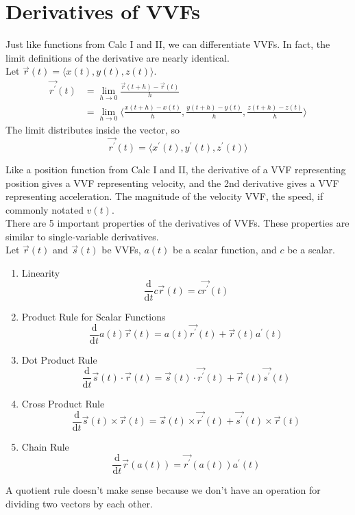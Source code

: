 \section{Derivatives of VVFs}
\noindent
Just like functions from Calc I and II, we can differentiate VVFs. In fact, the limit definitions of the derivative are nearly identical.\\
Let $\vec{r}(t) = \langle x(t), y(t), z(t) \rangle$.
\begin{align*}
	\vec{r^\prime}(t) &= \lim_{h\to 0}{\frac{\vec{r}(t+h)-\vec{r}(t)}{h}} \\
	&= \lim_{h\to 0}{\langle \frac{x(t+h)-x(t)}{h}, \frac{y(t+h)-y(t)}{h}, \frac{z(t+h)-z(t)}{h} \rangle}
\end{align*}
The limit distributes inside the vector, so
\begin{equation*}
	\vec{r^\prime}(t) = \langle x^{\prime}(t), y^{\prime}(t), z^{\prime}(t) \rangle
\end{equation*}

\noindent
Like a position function from Calc I and II, the derivative of a VVF representing position gives a VVF representing velocity, and the 2nd derivative gives a VVF representing acceleration. The magnitude of the velocity VVF, the speed, if commonly notated $v(t)$.\\

\noindent
There are 5 important properties of the derivatives of VVFs. These properties are similar to single-variable derivatives.\\
Let $\vec{r}(t)$ and $\vec{s}(t)$ be VVFs, $a(t)$ be a scalar function, and $c$ be a scalar.\\
\begin{enumerate}
	\item Linearity
	\begin{equation*}
		\frac{\mathrm{d}}{\mathrm{d}t}c\vec{r}(t) = c\vec{r^\prime}(t)	
	\end{equation*}
	\item Product Rule for Scalar Functions
	\begin{equation*}
		\frac{\mathrm{d}}{\mathrm{d}t}a(t)\vec{r}(t) = a(t)\vec{r^\prime}(t) + \vec{r}(t)a^{\prime}(t)
	\end{equation*}
	\item Dot Product Rule
	\begin{equation*}
		\frac{\mathrm{d}}{\mathrm{d}t}\vec{s}(t)\cdot\vec{r}(t) = \vec{s}(t)\cdot\vec{r^\prime}(t) + \vec{r}(t)\vec{s^\prime}(t)	
	\end{equation*}
	\item Cross Product Rule
	\begin{equation*}
		\frac{\mathrm{d}}{\mathrm{d}t}\vec{s}(t)\times\vec{r}(t) = \vec{s}(t)\times\vec{r^\prime}(t) + \vec{s^\prime}(t)\times\vec{r}(t)	
	\end{equation*}
	\item Chain Rule
	\begin{equation*}
		\frac{\mathrm{d}}{\mathrm{d}t}\vec{r}(a(t)) = \vec{r^\prime}(a(t))a^{\prime}(t)
	\end{equation*}
\end{enumerate}
A quotient rule doesn't make sense because we don't have an operation for dividing two vectors by each other.

